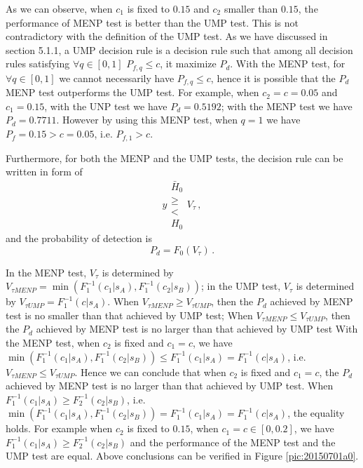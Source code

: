As we can observe, when $c_1$ is fixed to $0.15$ and $c_2$ smaller than $0.15$, the performance of MENP test is better than the UMP test. This is not contradictory with the definition of the UMP test. As we have discussed in section 5.1.1, a UMP decision rule is a decision rule such that among all decision rules satisfying $\forall q \in [0, 1]$ $P_{f,q} \leq c$, it maximize $P_d$. With the MENP test, for $\forall q \in [0, 1]$ we cannot necessarily have $P_{f,q} \leq c$, hence it is possible that the $P_d$ MENP test outperforms the UMP test.  For example, when $c_2 = c = 0.05$ and $c_1 = 0.15$, with the UNP test we have $P_d = 0.5192$; with the MENP test we have $P_d = 0.7711$. However by using this MENP test, when $q = 1$ we have $P_f = 0.15 > c = 0.05$, i.e. $P_{f,1} > c$.   

Furthermore, for both the MENP and the UMP tests, the decision rule can be written in form of
\begin{equation}
  y \substack{\bar{H}_0\\ \geq\\ < \\ H_0 } V_\tau\,,
  \label{20150701a4}
\end{equation}
and the probability of detection is 
\begin{equation}
  P_d = F_0(V_\tau)\,.
  \label{20150701a5}
\end{equation}

In the MENP test, $V_\tau$ is determined by $V_{\tau MENP}= \min (F_1^{-1}(c_1|s_A), F_1^{-1}(c_2|s_B))$; in the UMP test, $V_\tau$ is determined by $V_{\tau UMP} = F_1^{-1}(c|s_A)$. When $V_{\tau MENP}  \geq V_{\tau UMP}$, then the $P_d$ achieved by MENP test is no smaller than that achieved by UMP test; When $V_{\tau MENP}  \leq V_{\tau UMP}$, then the $P_d$ achieved by MENP test is no larger than that achieved by UMP test 
With the MENP test, when $c_2$ is fixed and $c_1 = c$, we have $\min (F_1^{-1}(c_1|s_A), F_1^{-1}(c_2|s_B)) \leq F_1^{-1}(c_1|s_A) = F_1^{-1}(c|s_A) $, i.e. 
$V_{\tau MENP} \leq V_{\tau UMP}$.
Hence we can conclude that when $c_2$ is fixed and $c_1 = c$, the $P_d$ achieved by MENP test is no larger than that achieved by UMP test. When $F_1^{-1}(c_1|s_A) \geq F_2^{-1}(c_2|s_B)$, i.e. $\min (F_1^{-1}(c_1|s_A), F_1^{-1}(c_2|s_B)) = F_1^{-1}(c_1|s_A) = F_1^{-1}(c|s_A) $, the equality holds.  For example when $c_2 $ is fixed to $0.15$, when $c_1 = c \in [0, 0.2]$, we have $F_1^{-1}(c_1|s_A) \geq F_2^{-1}(c_2|s_B)$ and the performance of the MENP test and the UMP test are equal. 
Above conclusions can be verified in Figure \ref{pic:20150701a0}. 

